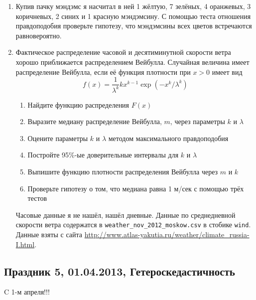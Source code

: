 \documentclass[12pt, a4paper]{article}
\begin{document}
\begin{enumerate}
\item Купив пачку мэндэмс я насчитал в ней 1 жёлтую, 7 зелёных, 4 оранжевых, 3 коричневых, 2 синих и 1 красную мэндэмсину. С помощью теста отношения правдоподобия проверьте гипотезу, что мэндэмсины всех цветов встречаются равновероятно.
\item \useR Фактическое распределение часовой и десятиминутной скорости ветра хорошо приближается распределением Вейбулла. Случайная величина имеет распределение Вейбулла, если её функция плотности при $x>0$ имеет вид
\[
f(x)=\frac{1}{\lambda^k}kx^{k-1}\exp(-x^k/\lambda^k)
\]
\begin{enumerate}
\item Найдите функцию распределения $F(x)$
\item Выразите медиану распределение Вейбулла, $m$, через параметры $k$ и $\lambda$
\item Оцените параметры $k$ и $\lambda$ методом максимального правдоподобия
\item Постройте 95\%-ые доверительные интервалы для $k$ и $\lambda$
\item Выпишите функцию плотности распределения Вейбулла через $m$ и $k$
\item Проверьте гипотезу о том, что медиана равна 1 м/сек с помощью трёх тестов
\end{enumerate}
Часовые данные я не нашёл, нашёл дневные. Данные по среднедневной скорости ветра содержатся в \verb|weather_nov_2012_moskow.csv| в стобике \verb|wind|. Данные взяты с сайта \url{http://www.atlas-yakutia.ru/weather/climate_russia-I.html}.

\end{enumerate}

\subsection{Праздник 5, 01.04.2013, Гетероскедастичность}

C 1-м апреля!!!
\end{document}
